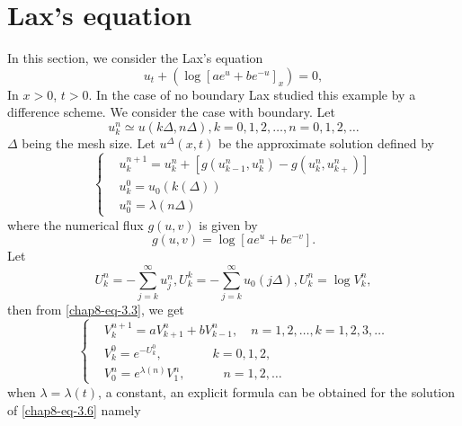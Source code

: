 \section{Lax's equation}\label{chap8-sec-3}
\pageoriginale

In this section, we consider the Lax's equation
\setcounter{equation}{0}
\begin{equation}\label{chap8-eq-3.1}
u_{t}+ \left(\log \left[ae^{u} + be^{-u}\right]_{x}\right)= 0,
\end{equation}
In $x>0$, $t>0$. In the case of no boundary Lax \cite{chap8-key9} studied this example by a difference scheme. We consider the case with boundary. Let
\begin{equation}\label{chap8-eq-3.2}
u_{k}^{n}\simeq u(k\Delta, n\Delta), k=0,1,2,\ldots,n = 0,1,2,\ldots
\end{equation}
$\Delta$ being the mesh size. Let $u^{\Delta}(x,t)$ be the approximate solution defined by
\begin{equation}\label{chap8-eq-3.3}
\left\{
\begin{aligned}
&u_{k}^{n+1} = u_{k}^{n} + \left[g(u_{k-1}^{n}, u_{k}^{n})-g(u_{k}^{n}, u_{k+}^{n})\right]\\
&u_{k}^{0} = u_{0}(k(\Delta))\\
&u_{0}^{n} = \lambda(n\Delta)
\end{aligned}
\right.
\end{equation}
where the numerical flux $g(u,v)$ is given by
\begin{equation}\label{chap8-eq-3.4}
g(u,v) = \log \left[ae^{u} + be^{-v}\right].
\end{equation}
Let
\begin{equation}\label{chap8-eq-3.5}
U_{k}^{n} = -\sum\limits_{j=k}^{\infty} u_{j}^{n}, U_{k}^{k} = -\sum_{j=k}^{\infty} u_{0}(j \Delta), U_{k}^{n}= \log V_{k}^{n},
\end{equation}
then from \eqref{chap8-eq-3.3}, we get
\begin{equation}\label{chap8-eq-3.6}
\left\{
\begin{aligned}
&V_{k}^{n+1} =aV_{k+1}^{n} +bV_{k-1}^{n}, \quad n=1,2,\ldots,k=1,2,3,\ldots\\
&V_{k}^{0}=e^{-U_{k}^{0}}, \qquad \qquad  k=0,1,2,\\
&V_{0}^{n} =e^{\lambda(n)}V_{1}^{n}, \qquad  \quad n=1,2,\ldots  
\end{aligned}
\right.
\end{equation}
when $\lambda = \lambda(t)$, a constant, an explicit formula can be obtained for the solution of \eqref{chap8-eq-3.6} namely
